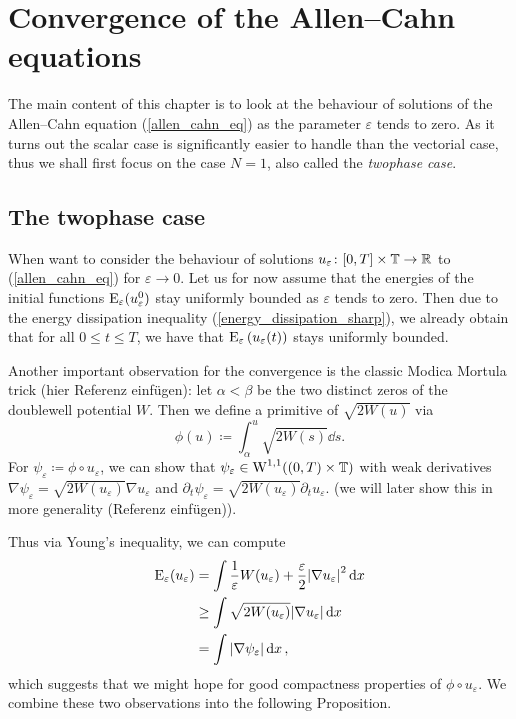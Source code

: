 \chapter{Convergence of the Allen--Cahn equations}

The main content of this chapter is to look at the behaviour of solutions of the Allen--Cahn equation (\ref{allen_cahn_eq}) as the parameter $ \varepsilon $ tends to zero. As it turns out the scalar case is significantly easier to handle than the vectorial case, thus we shall first focus on the case $ N = 1 $,
also called the \emph{twophase case}.

\section{The twophase case}

When want to consider the behaviour of solutions $ u_{ \varepsilon} \colon [0, T] \times \operatorname{\mathbb{T}} \to \mathbb{ R } $ to (\ref{allen_cahn_eq}) for $ \varepsilon \to 0 $. Let us for now assume that the energies of the initial functions $ \operatorname{E}_{ \varepsilon } ( u_{ \varepsilon }^{ 0 } ) $ stay uniformly bounded as $ \varepsilon $ tends to zero. 
Then due to the energy dissipation inequality (\ref{energy_dissipation_sharp}), we already obtain that for all
$ 0 \leq t \leq T $, we have that $ \operatorname{E}_{ \varepsilon } \left( u_{\varepsilon } ( t ) \right) $ stays uniformly  bounded.

Another important observation for the convergence is the classic Modica Mortula trick (hier Referenz einfügen): let $ \alpha < \beta $ be the two distinct zeros of the doublewell potential $ W $.
Then we define a primitive of $ \sqrt{ 2 W ( u ) } $ via
\begin{equation*}
	\phi ( u ) 
	\coloneqq
	\int_{ \alpha }^{ u }
		\sqrt{ 2 W ( s ) }
	\dd{ s }.
\end{equation*}
For $ \psi_{ \varepsilon } \coloneqq \phi \circ u_{ \varepsilon } $, we can show that $ \psi_{ \varepsilon } \in \operatorname{W}^{ 1, 1 } ( ( 0 , T ) \times \operatorname{\mathbb{T}} ) $ with weak derivatives $ \nabla \psi_{ \varepsilon } = \sqrt{ 2 W ( u_{ \varepsilon } ) } \nabla u_{ \varepsilon } $ and $ \partial_{ t } \psi_{ \varepsilon } = \sqrt{ 2 W ( u_{ \varepsilon } ) } \partial_{ t } u_{ \varepsilon } $. (we will later show this in more generality (Referenz einfügen)).

Thus via Young's inequality, we can compute
\begin{align}
	\operatorname{E}_{ \varepsilon } ( u_{ \varepsilon } )
	& =
	\int
		\frac{ 1 }{ \varepsilon }
		W ( u_{ \varepsilon } ) 
		+
		\frac{ \varepsilon }{ 2 }
		\abs{ \nabla u_{ \varepsilon } }^{ 2 }
	\dd{ x }
	\notag
	\\
	& \geq
	\int
		\sqrt{ 2 W ( u_{ \varepsilon } ) }
		\abs{ \nabla u_{ \varepsilon } }
	\dd{ x }
	\notag
	\\
	& =
	\int
		\abs{ \nabla \psi_{ \varepsilon} }
	\dd{ x }
	\label{modica_mortula_trick},
\end{align}
which suggests that we might hope for good compactness properties of $ \phi \circ u_{ \varepsilon } $.
We combine these two observations into the following Proposition.

